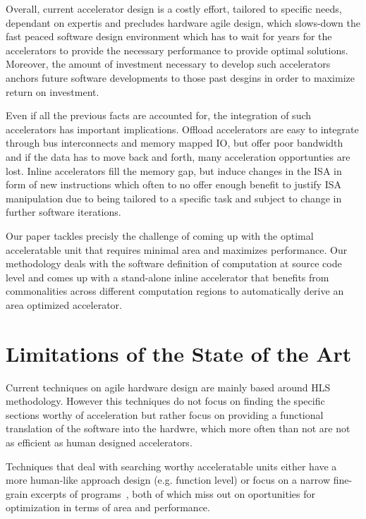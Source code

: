 \documentclass[pageno]{jpaper}
\begin{document}
Overall, current accelerator design is a costly effort, tailored to specific needs,
dependant on expertis and precludes hardware agile design, which slows-down the fast peaced software design environment which has to wait for years for the accelerators
to provide the necessary performance to provide optimal solutions.
Moreover, the amount of investment necessary to develop such accelerators anchors
future software developments to those past desgins in order to maximize return
on investment.

Even if all the previous facts are accounted for, the integration of such accelerators
has important implications. Offload accelerators are easy to integrate through bus interconnects and memory mapped IO, but offer poor bandwidth and if the data has to move back and forth, many acceleration opportunties are lost. Inline accelerators fill
the memory gap, but induce changes in the ISA in form of new instructions which 
often to no offer enough benefit to justify ISA manipulation due to being tailored to a specific task and subject to change in further software iterations.

Our paper tackles precisly the challenge of coming up with the optimal acceleratable
unit that requires minimal area and maximizes performance. Our methodology deals
with the software definition of computation at source code level and comes up with a
stand-alone inline accelerator that benefits from commonalities across different computation regions to automatically derive an area optimized accelerator.


\section{Limitations of the State of the Art}
\label{sec:limitations}

Current techniques on agile hardware design are mainly based around HLS methodology.
However this techniques do not focus on finding the specific sections worthy
of acceleration but rather focus on providing a functional translation of 
the software into the hardwre, which more often than not are not as efficient 
as human designed accelerators. 

Techniques that deal with searching worthy acceleratable units either have a more human-like approach design (e.g. function level) or focus on a narrow fine-grain excerpts of programs~\cite{RegionSeeker}, both of which miss out on oportunities for optimization in terms of area and performance. 
\end{document}
